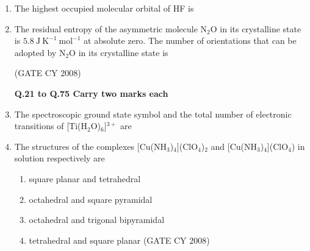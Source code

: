 \documentclass[12pt]{article}
\begin{document}
\begin{enumerate}
\item The highest occupied molecular orbital of HF is
\begin{enumerate}
\end{enumerate}


   \item  The residual entropy of the asymmetric molecule N$_2$O in its crystalline state is $5.8\ \mathrm{J\ K^{-1}\ mol^{-1}}$ at absolute zero. The number of orientations that can be adopted by N$_2$O in its crystalline state is \begin{enumerate}
\hfill{(GATE CY 2008)} 
\end{enumerate}


\textbf{Q.21 to Q.75 Carry two marks each}


\item The spectroscopic ground state symbol and the total number of electronic transitions of [Ti(H$_2$O)$_6$]$^{3+}$ are
\begin{enumerate}
\end{enumerate}


\item The structures of the complexes [Cu(NH$_3$)$_4$](ClO$_4$)$_2$ and [Cu(NH$_3$)$_4$](ClO$_4$) in solution respectively are
\begin{enumerate}
\item  square planar and tetrahedral 
\item  octahedral and square pyramidal
\item  octahedral and trigonal bipyramidal 
\item  tetrahedral and square planar    \hfill{(GATE CY 2008)}
\end{enumerate}



\end{enumerate}
\end{document}
